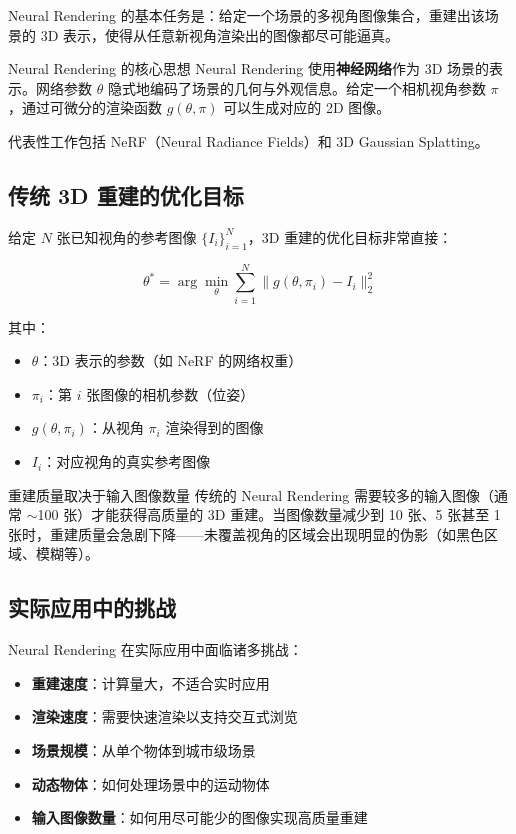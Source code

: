 \documentclass[a4paper]{article}
\begin{document}
Neural Rendering 的基本任务是：给定一个场景的多视角图像集合，重建出该场景的 3D 表示，使得从任意新视角渲染出的图像都尽可能逼真。

\begin{knowledgebox}{Neural Rendering 的核心思想}
Neural Rendering 使用\textbf{神经网络}作为 3D 场景的表示。网络参数 $\theta$ 隐式地编码了场景的几何与外观信息。给定一个相机视角参数 $\pi$，通过可微分的渲染函数 $g(\theta, \pi)$ 可以生成对应的 2D 图像。

代表性工作包括 NeRF（Neural Radiance Fields）和 3D Gaussian Splatting。
\end{knowledgebox}

\subsection{传统 3D 重建的优化目标}

给定 $N$ 张已知视角的参考图像 $\{I_i\}_{i=1}^{N}$，3D 重建的优化目标非常直接：

$$
\theta^* = \arg\min_{\theta} \sum_{i=1}^{N} \| g(\theta, \pi_i) - I_i \|_2^2
$$

其中：
\begin{itemize}
    \item $\theta$：3D 表示的参数（如 NeRF 的网络权重）
    \item $\pi_i$：第 $i$ 张图像的相机参数（位姿）
    \item $g(\theta, \pi_i)$：从视角 $\pi_i$ 渲染得到的图像
    \item $I_i$：对应视角的真实参考图像
\end{itemize}

\begin{warningbox}{重建质量取决于输入图像数量}
传统的 Neural Rendering 需要较多的输入图像（通常 $\sim$100 张）才能获得高质量的 3D 重建。当图像数量减少到 10 张、5 张甚至 1 张时，重建质量会急剧下降——未覆盖视角的区域会出现明显的伪影（如黑色区域、模糊等）。
\end{warningbox}

\subsection{实际应用中的挑战}

Neural Rendering 在实际应用中面临诸多挑战：

\begin{itemize}
    \item \textbf{重建速度}：计算量大，不适合实时应用
    \item \textbf{渲染速度}：需要快速渲染以支持交互式浏览
    \item \textbf{场景规模}：从单个物体到城市级场景
    \item \textbf{动态物体}：如何处理场景中的运动物体
    \item \textbf{输入图像数量}：如何用尽可能少的图像实现高质量重建
\end{itemize}
\end{document}

